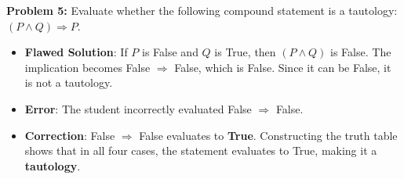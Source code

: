 \documentclass[11pt]{article}
\begin{document}
\vspace{10pt}
\textbf{Problem 5:} Evaluate whether the following compound statement is a tautology: $(P \wedge Q) \Rightarrow P$.
\begin{itemize}
    \item \textbf{Flawed Solution}: If $P$ is False and $Q$ is True, then $(P \wedge Q)$ is False. The implication becomes False $\Rightarrow$ False, which is False. Since it can be False, it is not a tautology.
    \item \textbf{Error}: The student incorrectly evaluated False $\Rightarrow$ False. 
    \item \textbf{Correction}: False $\Rightarrow$ False evaluates to \textbf{True}. Constructing the truth table shows that in all four cases, the statement evaluates to True, making it a \textbf{tautology}.
\end{itemize}
\end{document}
